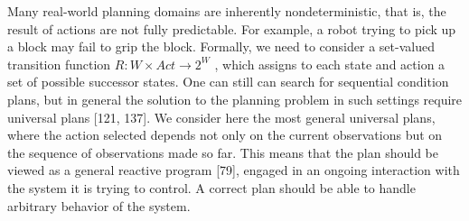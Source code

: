





Many real-world planning domains are inherently nondeterministic, that is, the result of actions are not fully predictable. For example, a robot trying to pick up a block may fail to grip the block. Formally, we need to consider a set-valued transition function $R : W \times Act \rightarrow 2^W$ , which assigns to each state and action a set of possible successor states. One can still can search for sequential condition plans, but in general the solution to the planning problem in such settings require universal plans [121, 137]. We consider here the most general universal plans, where the action selected depends not only on the current observations but on the sequence of observations made so far. This means that the plan should be viewed as a general reactive program [79], engaged in an ongoing interaction with the system it is trying to control. A correct plan should be able to handle arbitrary behavior of the system.



